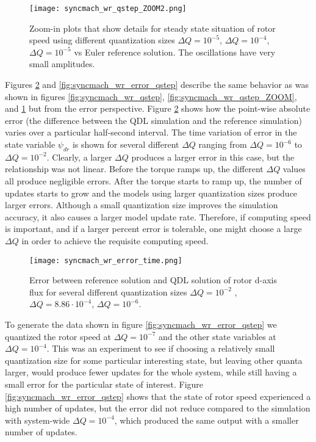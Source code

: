 \begin{figure}[h]
    \centering
    \texttt{[image: syncmach\_wr\_qstep\_ZOOM2.png]}
    \caption{Zoom-in plots that show details for steady state situation of rotor speed using different quantization sizes $\Delta Q = 10^{-5}$, $\Delta Q = 10^{-4}$, $\Delta Q = 10^{-5}$ vs Euler reference solution. The oscillations have very small amplitudes.}
    \label{fig:syncmach_wr_qstep_ZOOM2}
\end{figure}

Figures \ref{fig:syncmach_wr_error_time} and \ref{fig:syncmach_wr_error_qstep} describe the same behavior as was shown in figures \ref{fig:syncmach_wr_qstep}, \ref{fig:syncmach_wr_qstep_ZOOM}, and \ref{fig:syncmach_wr_qstep_ZOOM2} but from the error perspective. Figure \ref{fig:syncmach_wr_error_time} shows how the point-wise absolute error (the difference between the QDL simulation and the reference simulation) varies over a particular half-second interval. The time variation of error in the state variable $\psi_{dr}$ is shown for several different $\Delta Q$ ranging from $\Delta Q = 10^{-6}$ to $\Delta Q = 10^{-2}$. Clearly, a larger $\Delta Q$ produces a larger error in this case, but the relationship was not linear. Before the torque ramps up, the different $\Delta Q$ values all produce negligible errors. After the torque starts to ramp up, the number of updates starts to grow and the models using larger quantization sizes produce larger errors. Although a small quantization size improves the simulation accuracy, it also causes a larger model update rate. Therefore, if computing speed is important, and if a larger percent error is tolerable, one might choose a large $\Delta Q$ in order to achieve the requisite computing speed.

\begin{figure}[h]
    \centering
    \texttt{[image: syncmach\_wr\_error\_time.png]}
    \caption{Error between reference solution and QDL solution of rotor d-axis flux for several different quantization sizes $\Delta Q = 10^{-2}$ , $\Delta Q = 8.86\cdot 10^{-4}$, $\Delta Q = 10^{-6}$.}
    \label{fig:syncmach_wr_error_time}
\end{figure} 

To generate the data shown in figure \ref{fig:syncmach_wr_error_qstep} we quantized the rotor speed at $\Delta Q = 10^{-7}$ and the other state variables at $\Delta Q = 10^{-4}$. This was an experiment to see if choosing a relatively small quantization size for some particular interesting state, but leaving other quanta larger, would produce fewer updates for the whole system, while still having a small error for the particular state of interest. Figure \ref{fig:syncmach_wr_error_qstep} shows that the state of rotor speed experienced a high number of updates, but the error did not reduce compared to the simulation with system-wide $\Delta Q = 10^{-4}$, which produced the same output with a smaller number of updates. 

